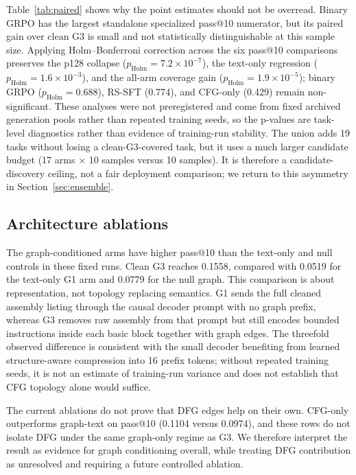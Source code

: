 \documentclass[11pt]{article}
\begin{document}
Table~\ref{tab:paired} shows why the point estimates should not be overread. Binary GRPO has the largest standalone specialized pass@10 numerator, but its paired gain over clean G3 is small and not statistically distinguishable at this sample size. Applying Holm--Bonferroni correction across the six pass@10 comparisons preserves the p128 collapse (\(p_{\mathrm{Holm}}=7.2{\times}10^{-7}\)), the text-only regression (\(p_{\mathrm{Holm}}=1.6{\times}10^{-3}\)), and the all-arm coverage gain (\(p_{\mathrm{Holm}}=1.9{\times}10^{-5}\)); binary GRPO (\(p_{\mathrm{Holm}}=0.688\)), RS-SFT (0.774), and CFG-only (0.429) remain non-significant. These analyses were not preregistered and come from fixed archived generation pools rather than repeated training seeds, so the p-values are task-level diagnostics rather than evidence of training-run stability. The union adds 19 tasks without losing a clean-G3-covered task, but it uses a much larger candidate budget (17 arms $\times$ 10 samples versus 10 samples). It is therefore a candidate-discovery ceiling, not a fair deployment comparison; we return to this asymmetry in Section~\ref{sec:ensemble}.

\subsection{Architecture ablations}

The graph-conditioned arms have higher pass@10 than the text-only and null controls in these fixed runs. Clean G3 reaches 0.1558, compared with 0.0519 for the text-only G1 arm and 0.0779 for the null graph. This comparison is about representation, not topology replacing semantics. G1 sends the full cleaned assembly listing through the causal decoder prompt with no graph prefix, whereas G3 removes raw assembly from that prompt but still encodes bounded instructions inside each basic block together with graph edges. The threefold observed difference is consistent with the small decoder benefiting from learned structure-aware compression into 16 prefix tokens; without repeated training seeds, it is not an estimate of training-run variance and does not establish that CFG topology alone would suffice.

The current ablations do not prove that DFG edges help on their own. CFG-only outperforms graph-text on pass@10 (0.1104 versus 0.0974), and these rows do not isolate DFG under the same graph-only regime as G3. We therefore interpret the result as evidence for graph conditioning overall, while treating DFG contribution as unresolved and requiring a future controlled ablation.
\end{document}
